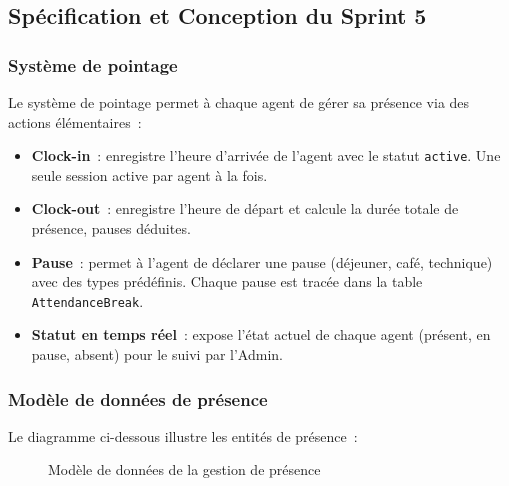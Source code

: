 \subsection{Spécification et Conception du Sprint 5}
\label{subsec:sprint5_spec}

\subsubsection{Système de pointage}

Le système de pointage permet à chaque agent de gérer sa présence via des actions
élémentaires~:

\begin{itemize}
    \item \textbf{Clock-in}~: enregistre l'heure d'arrivée de l'agent avec le statut
    \texttt{active}. Une seule session active par agent à la fois.
    \item \textbf{Clock-out}~: enregistre l'heure de départ et calcule la durée totale
    de présence, pauses déduites.
    \item \textbf{Pause}~: permet à l'agent de déclarer une pause (déjeuner, café,
    technique) avec des types prédéfinis. Chaque pause est tracée dans la table
    \texttt{AttendanceBreak}.
    \item \textbf{Statut en temps réel}~: expose l'état actuel de chaque agent
    (présent, en pause, absent) pour le suivi par l'Admin.
\end{itemize}

\subsubsection{Modèle de données de présence}

Le diagramme ci-dessous illustre les entités de présence~:

\begin{figure}[H]
    \centering
    \caption{Modèle de données de la gestion de présence}
    \label{fig:sprint5_attendance_model}
\end{figure}

